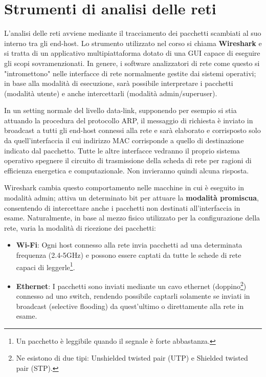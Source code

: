 \section{Strumenti di analisi delle reti}
L'analisi delle reti avviene mediante il tracciamento dei pacchetti scambiati al suo interno tra gli end-host. Lo strumento utilizzato nel corso si
chiama \textbf{Wireshark} e si tratta di un applicativo multipiattaforma dotato di una GUI capace di eseguire gli scopi sovramenzionati. In genere, i
software analizzatori di rete come questo si "intromettono" nelle interfacce di rete normalmente gestite dai sistemi operativi; in base alla modalità
di esecuzione, sarà possibile interpretare i pacchetti (modalità utente) e anche intercettarli (modalità admin/superuser).\par
In un setting normale del livello data-link, supponendo per esempio si stia attuando la procedura del protocollo ARP, il messaggio di richiesta è
inviato in broadcast a tutti gli end-host connessi alla rete e sarà elaborato e corrisposto solo da quell'interfaccia il cui indirizzo MAC corrisponde
a quello di destinazione indicato dal pacchetto. Tutte le altre interfacce vedranno il proprio sistema operativo spegnere il circuito di trasmissione
della scheda di rete per ragioni di efficienza energetica e computazionale. Non invieranno quindi alcuna risposta.\par
Wireshark cambia questo comportamento nelle macchine in cui è eseguito in modalità admin; attiva un determinato bit per attuare la \textbf{modalità
promiscua}, consentendo di intercettare anche i pacchetti non destinati all'interfaccia in esame. Naturalmente, in base al mezzo fisico utilizzato per
la configurazione della rete, varia la modalità di ricezione dei pacchetti: \begin{itemize}
    \item \textbf{Wi-Fi}: Ogni host connesso alla rete invia pacchetti ad una determinata frequenza (2.4-5GHz) e possono essere captati da tutte le
    schede di rete capaci di leggerle\footnote{Un pacchetto è leggibile quando il segnale è forte abbastanza.}.
    \item \textbf{Ethernet}: I pacchetti sono inviati mediante un cavo ethernet (doppino\footnote{Ne esistono di due tipi: Unshielded twisted pair (UTP)
    e Shielded twisted pair (STP).}) connesso ad uno switch, rendendo possibile captarli solamente se inviati in broadcast (selective flooding) da
    quest'ultimo o direttamente alla rete in esame.
\end{itemize}
